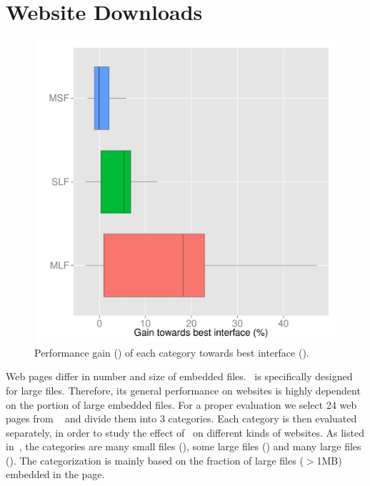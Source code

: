 \clearpage
\section{Website Downloads}
\label{sec:evaluation-website}

\begin{figure}[!htb]
    \begin{minipage}[t]{0.8\linewidth}
	\begin{center}
        \includegraphics[width=\linewidth]{Figures/website-category-performance.pdf}
		\caption{\label{fig:website-performance-category}Performance gain (\perc) of each category towards best interface (\ethernet).}
    \end{center}
    \end{minipage}
\vspace*{-0.3cm}
\end{figure}

Web pages differ in number and size of embedded files. 
\mhttp~is specifically designed for large files. 
Therefore, its general performance on websites is highly dependent on the portion of large embedded files. 
For a proper evaluation we select 24 web pages from ~\cite{URL-ALEXA} and divide them into 3 categories. 
Each category is then evaluated separately, in order to study the effect of \mhttp~on different kinds of websites. 
As listed in~, the categories are many small files (), some large files () and 
many large files (). 
The categorization is mainly based on the fraction of large files ($>$1MB) embedded in the page. 

